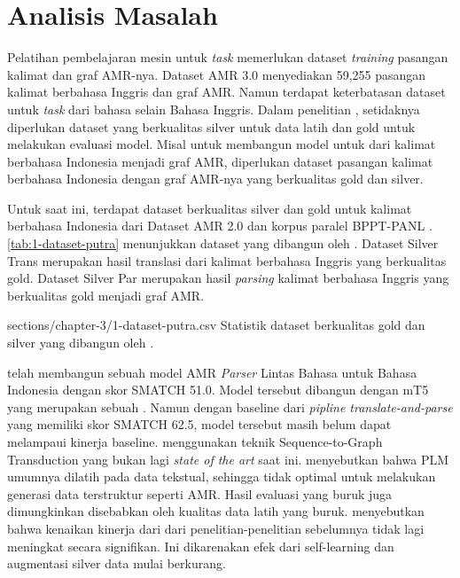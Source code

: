 \section{Analisis Masalah}

Pelatihan pembelajaran mesin untuk \textit{task} \amrparsing{} memerlukan dataset \textit{training} pasangan kalimat dan graf \gls{AMR}-nya.
Dataset AMR 3.0 menyediakan 59,255 pasangan kalimat berbahasa Inggris dan graf \gls{AMR}.
Namun terdapat keterbatasan dataset untuk \textit{task} \amrparsing{} dari bahasa selain Bahasa Inggris.
Dalam penelitian \textcite{blloshmi2020}, setidaknya diperlukan dataset yang berkualitas silver untuk data latih dan gold untuk melakukan evaluasi model.
Misal untuk membangun model untuk \amrparsing{} dari kalimat berbahasa Indonesia menjadi graf \gls{AMR}, diperlukan dataset pasangan kalimat berbahasa Indonesia dengan graf \gls{AMR}-nya yang berkualitas gold dan silver.

Untuk saat ini, terdapat dataset berkualitas silver dan gold untuk kalimat berbahasa Indonesia dari Dataset AMR 2.0 dan korpus paralel BPPT-PANL .
\cref{tab:1-dataset-putra} menunjukkan dataset yang dibangun oleh \textcite{putra2022}.
Dataset Silver Trans merupakan hasil translasi dari kalimat berbahasa Inggris yang berkualitas gold.
Dataset Silver Par merupakan hasil \textit{parsing} kalimat berbahasa Inggris yang berkualitas gold menjadi graf \gls{AMR}.

  {sections/chapter-3/1-dataset-putra.csv}
  {Statistik dataset berkualitas gold dan silver yang dibangun oleh \textcite{putra2022}.}

\textcite{putra2022} telah membangun sebuah model \gls{AMR} \textit{Parser} Lintas Bahasa untuk Bahasa Indonesia dengan skor \gls{SMATCH} 51.0.
Model tersebut dibangun dengan \mwordem mT5 yang merupakan sebuah .
Namun dengan baseline dari \textit{pipline translate-and-parse} yang memiliki skor \gls{SMATCH} 62.5, model tersebut masih belum dapat melampaui kinerja baseline.
\textcite{putra2022} menggunakan teknik Sequence-to-Graph Transduction  yang bukan lagi \textit{state of the art} \amrparsing{} saat ini.
\textcite{bai2022} menyebutkan bahwa \gls{PLM} umumnya dilatih pada data tekstual, sehingga tidak optimal untuk melakukan generasi data terstruktur seperti \gls{AMR}.
Hasil evaluasi yang buruk juga dimungkinkan disebabkan oleh kualitas data latih yang buruk.
\textcite{lee2022} menyebutkan bahwa kenaikan kinerja dari \amrparsing{} dari penelitian-penelitian sebelumnya tidak lagi meningkat secara signifikan.
Ini dikarenakan efek dari self-learning dan augmentasi silver data mulai berkurang.
